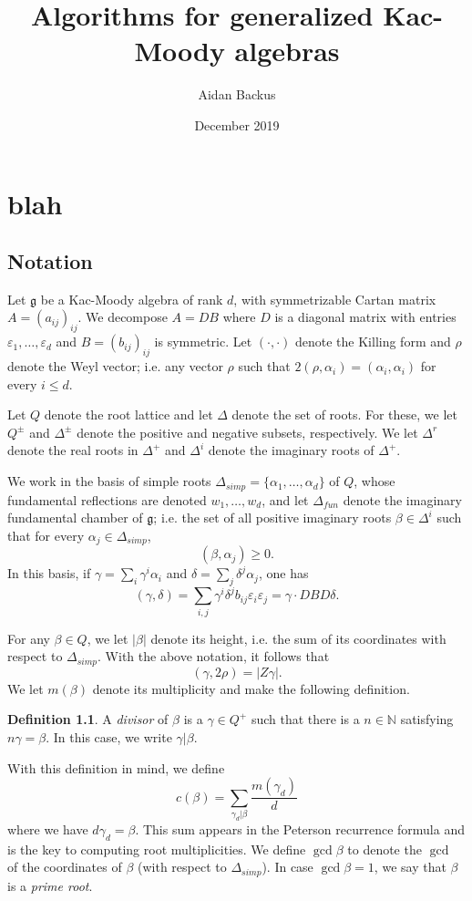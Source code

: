 \documentclass[12pt]{report}
\title{Algorithms for generalized Kac-Moody algebras}
\author{Aidan Backus}
\date{December 2019}
\newcommand{\NN}{\mathbb{N}}
\newcommand{\g}{\mathfrak g}
\newcommand{\dfn}[1]{\emph{#1}\index{#1}}
\theoremstyle{definition}
\newtheorem{definition}[theorem]{Definition}
\begin{document}
\chapter{blah}
\section{Notation}
Let $\g$ be a Kac-Moody algebra of rank $d$, with symmetrizable Cartan matrix $A = (a_{ij})_{ij}$. We decompose $A = DB$ where $D$ is a diagonal matrix with entries $\varepsilon_1, \dots, \varepsilon_d$ and $B = (b_{ij})_{ij}$ is symmetric. Let $(\cdot,\cdot)$ denote the Killing form and $\rho$ denote the Weyl vector; i.e. any vector $\rho$ such that $2(\rho, \alpha_i) = (\alpha_i, \alpha_i)$ for every $i \leq d$.

Let $Q$ denote the root lattice and let $\Delta$ denote the set of roots. For these, we let $Q^\pm$ and $\Delta^\pm$ denote the positive and negative subsets, respectively. We let $\Delta^r$ denote the real roots in $\Delta^+$ and $\Delta^i$ denote the imaginary roots of $\Delta^+$.

We work in the basis of simple roots $\Delta_{simp} = \{\alpha_1, \dots, \alpha_d\}$ of $Q$, whose fundamental reflections are denoted $w_1, \dots, w_d$, and let $\Delta_{fun}$ denote the imaginary fundamental chamber of $\g$; i.e. the set of all positive imaginary roots $\beta \in \Delta^i$ such that for every $\alpha_j \in \Delta_{simp}$,
$$(\beta, \alpha_j) \geq 0.$$
In this basis, if $\gamma = \sum_i \gamma^i \alpha_i$ and $\delta = \sum_j \delta^j \alpha_j$, one has
$$(\gamma, \delta) = \sum_{i,j} \gamma^i \delta^j b_{ij} \varepsilon_i \varepsilon_j = \gamma \cdot DBD \delta.$$

For any $\beta \in Q$, we let $|\beta|$ denote its height, i.e. the sum of its coordinates with respect to $\Delta_{simp}$. With the above notation, it follows that
$$(\gamma, 2\rho) = |Z\gamma|.$$ We let $m(\beta)$ denote its multiplicity and make the following definition.
\begin{definition}
	A \dfn{divisor} of $\beta$ is a $\gamma \in Q^+$ such that there is a $n \in \NN$ satisfying $n\gamma = \beta$. In this case, we write $\gamma|\beta$.
\end{definition}
With this definition in mind, we define
$$c(\beta) = \sum_{\gamma_d|\beta} \frac{m(\gamma_d)}{d}$$
where we have $d\gamma_d = \beta$. This sum appears in the Peterson recurrence formula and is the key to computing root multiplicities.
We define $\gcd \beta$ to denote the $\gcd$ of the coordinates of $\beta$ (with respect to $\Delta_{simp}$). In case $\gcd \beta = 1$, we say that $\beta$ is a \emph{prime root}.
\end{document}
